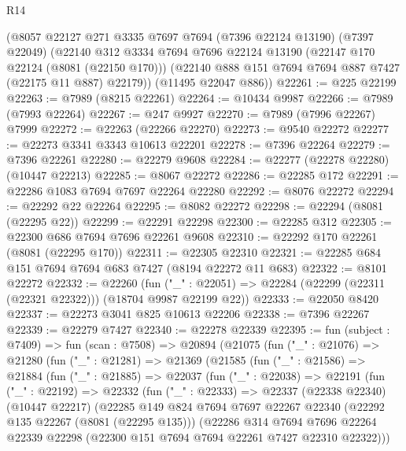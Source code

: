 \begin{lexlean}{R14}
\begin{coremodule}
    (@8057
      @22127
      @271
      @3335
      @7697
      @7694
      (@7396 @22124 @13190)
      (@7397 @22049)
      (@22140
        @312
        @3334
        @7694
        @7696
        @22124
        @13190
        (@22147 @170 @22124 (@8081 (@22150 @170)))
        (@22140 @888 @151 @7694 @7694 @887 @7427 (@22175 @11 @887) @22179))
      (@11495 @22047 @886))
@22261 := @225 @22199
@22263 := @7989 (@8215 @22261)
@22264 := @10434 @9987
@22266 := @7989 (@7993 @22264)
@22267 := @247 @9927
@22270 := @7989 (@7996 @22267) @7999
@22272 := @22263 (@22266 @22270)
@22273 := @9540 @22272
@22277 := @22273 @3341 @3343 @10613 @22201
@22278 := @7396 @22264
@22279 := @7396 @22261
@22280 := @22279 @9608
@22284 := @22277 (@22278 @22280) (@10447 @22213)
@22285 := @8067 @22272
@22286 := @22285 @172
@22291 := @22286 @1083 @7694 @7697 @22264 @22280
@22292 := @8076 @22272
@22294 := @22292 @22 @22264
@22295 := @8082 @22272
@22298 := @22294 (@8081 (@22295 @22))
@22299 := @22291 @22298
@22300 := @22285 @312
@22305 := @22300 @686 @7694 @7696 @22261 @9608
@22310 := @22292 @170 @22261 (@8081 (@22295 @170))
@22311 := @22305 @22310
@22321 := @22285 @684 @151 @7694 @7694 @683 @7427 (@8194 @22272 @11 @683)
@22322 := @8101 @22272
@22332 := @22260
    (fun ("_" : @22051) => @22284 (@22299 (@22311 (@22321 @22322))) (@18704 @9987 @22199 @22))
@22333 := @22050 @8420
@22337 := @22273 @3041 @825 @10613 @22206
@22338 := @7396 @22267
@22339 := @22279 @7427
@22340 := @22278 @22339
@22395 := fun (subject : @7409) =>
  fun (scan : @7508) =>
  @20894
    (@21075
      (fun ("_" : @21076) =>
      @21280
        (fun ("_" : @21281) =>
        @21369
          (@21585
            (fun ("_" : @21586) =>
            @21884
              (fun ("_" : @21885) =>
              @22037
                (fun ("_" : @22038) =>
                @22191
                  (fun ("_" : @22192) =>
                  @22332
                    (fun ("_" : @22333) =>
                    @22337
                      (@22338 @22340)
                      (@10447 @22217)
                      (@22285
                        @149
                        @824
                        @7694
                        @7697
                        @22267
                        @22340
                        (@22292 @135 @22267 (@8081 (@22295 @135)))
                        (@22286
                          @314
                          @7694
                          @7696
                          @22264
                          @22339
                          @22298
                          (@22300 @151 @7694 @7694 @22261 @7427 @22310 @22322)))

\end{coremodule}
\end{lexlean}
